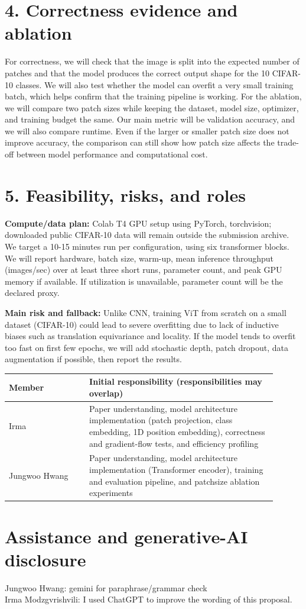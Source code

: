 \documentclass[10pt]{article}
\begin{document}
\section*{4. Correctness evidence and ablation}

For correctness, we will check that the image is split into the expected number of patches and that the model produces the correct output shape for the 10 CIFAR-10 classes. We will also test whether the model can overfit a very small training batch, which helps confirm that the training pipeline is working. For the ablation, we will compare two patch sizes while keeping the dataset, model size, optimizer, and training budget the same. Our main metric will be validation accuracy, and we will also compare runtime. Even if the larger or smaller patch size does not improve accuracy, the comparison can still show how patch size affects the trade-off between model performance and computational cost.

\section*{5. Feasibility, risks, and roles}

\textbf{Compute/data plan:} 
Colab T4 GPU setup using PyTorch, torchvision; downloaded public CIFAR-10 data will remain outside the submission archive. We target a 10-15 minutes run per configuration, using six transformer blocks. We will report hardware, batch size, warm-up, mean inference throughput (images/sec) over at least three short runs, parameter count, and peak GPU memory if available. If utilization is unavailable, parameter count will be the declared proxy.

\textbf{Main risk and fallback:} 
Unlike CNN, training ViT from scratch on a small dataset (CIFAR-10) could lead to severe overfitting due to lack of inductive biases such as translation equivariance and locality. If the model tends to overfit too fast on first few epochs, we will add stochastic depth, patch dropout, data augmentation if possible, then report the results.

\vspace{-2pt}
\begin{center}\small
\begin{tabular}{p{0.27\linewidth}p{0.63\linewidth}}
\toprule
Member & Initial responsibility (responsibilities may overlap) \\
\midrule
Irma & Paper understanding, model architecture implementation (patch projection, class embedding, 1D position embedding), correctness and gradient-flow tests, and efficiency profiling \\
Jungwoo Hwang & Paper understanding, model architecture implementation (Transformer encoder), training and evaluation pipeline, and patchsize ablation experiments \\
\bottomrule
\end{tabular}
\end{center}

\section*{Assistance and generative-AI disclosure}

Jungwoo Hwang: gemini for paraphrase/grammar check\\
Irma Modzgvrishvili: I used ChatGPT to improve the wording of this proposal.
\end{document}
